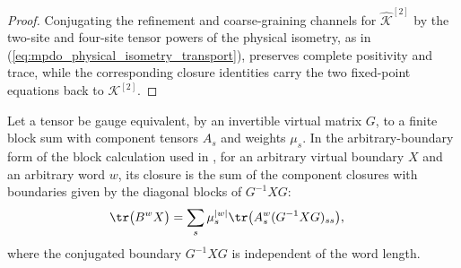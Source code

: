 \begin{proof}\leanok
    Conjugating the refinement and coarse-graining channels for
    $\widehat{\mathcal K}^{[2]}$ by the two-site and four-site tensor
    powers of the physical isometry, as in
    (\ref{eq:mpdo_physical_isometry_transport}), preserves complete positivity
    and trace, while the corresponding closure identities carry the two
    fixed-point equations back to $\mathcal K^{[2]}$.
\end{proof}

\begin{lemma}
    \label{thm:mpdo_canonical_block_sum_arbitrary_boundary}
    \leanok
    Let a tensor be gauge equivalent, by an invertible virtual matrix $G$, to
    a finite block sum with component tensors $A_s$ and weights $\mu_s$. In
    the arbitrary-boundary form of the block calculation used in
    \cite[lines~186--195 and Appendix~C.2, lines~1646--1665 and 1810--1825]
    {Cirac2016MPDO_arXiv}, for an arbitrary virtual boundary $X$ and an
    arbitrary word $w$, its closure is the sum of the component closures with
    boundaries given by the diagonal blocks of $G^{-1}XG$:
    \begin{align}
        \tr\bigl(B^wX\bigr)
         & =\sum_s \mu_s^{|w|}\tr\bigl(A_s^w(G^{-1}XG)_{ss}\bigr),
        \notag
    \end{align}
    where the conjugated boundary $G^{-1}XG$ is independent of the word length.
\end{lemma}

